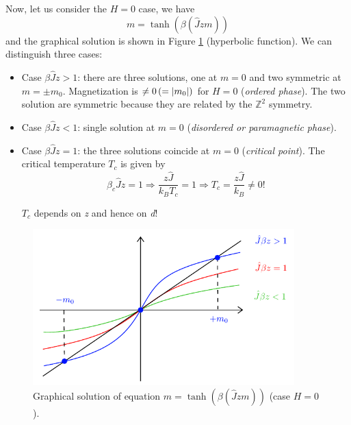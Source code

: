 \documentclass[../../Main/Main.tex]{subfiles}
\begin{document}
Now, let us consider the \( H=0 \) case, we have
\begin{equation}
  m =  \tanh (\beta (\hat{J}z m ))
\end{equation}
and the graphical solution is shown in Figure \ref{fig:11_1} (hyperbolic function).
We can distinguish three cases:
\begin{itemize}
\item Case \( \beta \hat{J} z > 1  \): there are three solutions, one at \( m=0 \) and two symmetric at \( m=\pm m_0 \). Magnetization is \( \neq 0 \, (= \abs{m_0} )\) for \( H=0 \) (\emph{ordered phase}).  The two solution are symmetric because they are related by the \( \mathbb{Z}^2 \)  symmetry.
\item Case \( \beta \hat{J} z < 1  \): single solution at \( m=0 \) (\emph{disordered or paramagnetic phase}).
\item Case \( \beta \hat{J} z = 1  \): the three solutions coincide at \( m=0 \) (\emph{critical point}). 
The critical temperature \( T_c \) is given by
\begin{equation*}
 \beta_c \hat{J} z = 1 \Rightarrow  \frac{z \hat{J} }{k_B T_c} = 1 \Rightarrow T_c = \frac{z \hat{J} }{k_B} \neq 0!
\end{equation*}
\begin{remark}
\( T_c \) depends on \emph{z} and hence on \emph{d}!
\end{remark}
\end{itemize}



\begin{figure}[h!]
\centering
\includegraphics[width=0.9\textwidth]{./img/1.pdf}
\caption{\label{fig:11_1} Graphical solution of equation \(m =  \tanh (\beta (\hat{J}z m )) \) (case \(H=0\)).}
\end{figure}
\end{document}
